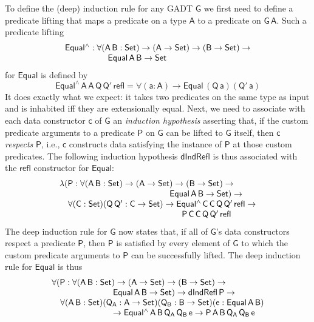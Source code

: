 \documentclass[sigplan,screen]{acmart}
\begin{document}
To define the (deep) induction rule for any GADT $\mathsf{G}$ we first
need to define a predicate lifting that maps a predicate on a type
$\mathsf{A}$ to a predicate on $\mathsf{G\,A}$. Such a predicate
lifting
\[\begin{array}{l}
\mathsf{Equal^{\wedge} : \forall (A\,B : Set) \to (A \to Set)
  \to (B \to Set) \to}\\
\mathsf{\hspace*{0.7in}Equal\,A\,B \to Set}
\end{array}\]
for $\mathsf{Equal}$ is defined by
\[\mathsf{Equal^{\wedge}\,A\,A\,Q\,Q'\,refl = \forall (a :
  A) \to Equal\,(Q\,a)(Q'\,a)}\]
It does exactly what we expect: it takes two predicates on the same
type as input and is inhabited iff they are extensionally equal.
Next, we need to associate with each data constructor $\mathsf{c}$ of
$\mathsf{G}$ an {\em induction hypothesis} asserting that, if the
custom predicate arguments to a predicate $\mathsf{P}$ on $\mathsf{G}$
can be lifted to $\mathsf{G}$ itself, then $\mathsf{c}$ {\em respects}
$\mathsf{P}$, i.e., $\mathsf{c}$ constructs data satisfying the
instance of $\mathsf{P}$ at those custom predicates. The following
induction hypothesis $\mathsf{dIndRefl}$ is thus associated with the
$\mathsf{refl}$ constructor for $\mathsf{Equal}$:
\begin{equation*}\label{eq:ind-refl}
\begin{array}{l}
\mathsf{\lambda (P : \forall (A\,B : Set) \to (A \to Set) \to (B \to
  Set) \to}\\
\mathsf{\hspace*{1.8in}Equal\,A\,B \to Set) \to} \\ 
\quad\mathsf{\forall (C : Set) (Q\, Q' : C \to Set) \to
  Equal^{\wedge}\,C\,C\,Q\,Q'\,refl \to}\\
\mathsf{\hspace*{2in}P\,C\,C\,Q\,Q'\,refl} 
\end{array}
\end{equation*}
The deep induction rule for $\mathsf{G}$ now states that, if all of
$\mathsf{G}$'s data constructors respect a predicate $\mathsf{P}$,
then $\mathsf{P}$ is satisfied by every element of $\mathsf{G}$ to
which the custom predicate arguments to $\mathsf{P}$ can be
successfully lifted.  The deep induction rule for $\mathsf{Equal}$ is
thus
\begin{equation}\label{eq:ind-equal}
\begin{array}{l}
\mathsf{\forall (P : \forall (A\,B : Set) \to (A \to Set) \to (B \to
  Set) \to}\\
\mathsf{\hspace*{1in}Equal\,A\,B \to Set) \to dIndRefl\,P \to}\\ \quad 
\mathsf{\forall (A\,B : Set) (Q_A : A \to Set) (Q_B : B \to Set)(e:
  Equal\,A\,B)}\\
\mathsf{\hspace*{1in}\to Equal^{\wedge}\,A\,B\,Q_A\,Q_B\,e \to
  P\,A\,B\,Q_A\,Q_B\,e}\\ 
\mathsf{\hspace*{2in} }
\end{array}
\end{equation}
\end{document}
